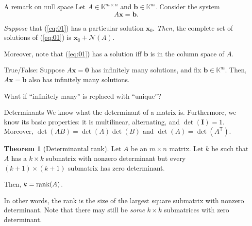 \documentclass[dvipsnames]{beamer}
\newcommand{\TT}{\mathsf{T}}
\theoremstyle{definition}
\newtheorem{thm}{Theorem}
\begin{document}
\begin{frame}{A remark on null space}
    Let $A \in \mathbb{K}^{m \times n}$ and $\mathbf{b} \in \mathbb{K}^{m}$. Consider the system
    \begin{equation} \label{eq:01} \tag{$\ast$}
        A \mathbf{x} = \mathbf{b}.
    \end{equation}

    \emph{Suppose} that (\ref{eq:01}) has a particular solution $\mathbf{x}_{0}$. \emph{Then}, the complete set of solutions of (\ref{eq:01}) is $\mathbf{x}_{0} + \mathcal{N}(A)$. \pause

    Moreover, note that (\ref{eq:01}) has a solution iff $\mathbf{b}$ is in the column space of $A$. \pause

    True/False: Suppose $A \mathbf{x} = \mathbf{0}$ has infinitely many solutions, and fix $\mathbf{b} \in \mathbb{K}^{m}$. Then, $A \mathbf{x} = \mathbf{b}$ also has infinitely many solutions. \pause

    What if ``infinitely many'' is replaced with ``unique''?
\end{frame}
\begin{frame}{Determinants}
    We know what the determinant of a matrix is. Furthermore, we know its basic properties: it is multilinear, alternating, and $\det(\mathbf{I}) = 1$. \pause Moreover, $\det(AB) = \det(A)\det(B)$ and $\det(A) = \det(A^{\TT})$. \pause

    \begin{thm}[Determinantal rank]
        Let $A$ be an $m \times n$ matrix. \pause Let $k$ be such that $A$ has a $k \times k$ submatrix with nonzero determinant \pause but every $(k + 1) \times (k + 1)$ submatrix has zero determinant. \pause

        Then, $k = \operatorname{rank}(A)$.
    \end{thm} \pause

    In other words, the rank is the size of the largest square submatrix with nonzero determinant. \pause Note that there may still be \emph{some} $k \times k$ submatrices with zero determinant.
\end{frame}
\end{document}
